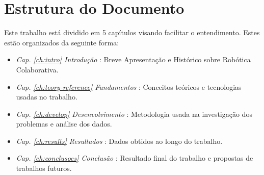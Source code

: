 \section{Estrutura do Documento}

Este trabalho está dividido em 5 capítulos visando facilitar o entendimento. Estes estão organizados da seguinte forma:

\begin{itemize}
    \item \textit{Cap. \ref{ch:intro} Introdução} : Breve Apresentação e Histórico sobre Robótica Colaborativa.
    \item \textit{Cap. \ref{ch:teory-reference} Fundamentos} : Conceitos teóricos e tecnologias usadas no trabalho.
    \item \textit{Cap. \ref{ch:develop} Desenvolvimento} : Metodologia usada na investigação dos problemas e análise dos dados.
    \item \textit{Cap. \ref{ch:results} Resultados} : Dados obtidos ao longo do trabalho.
    \item \textit{Cap. \ref{ch:conclusoes} Conclusão} : Resultado final do trabalho e propostas de trabalhos futuros.
\end{itemize}
